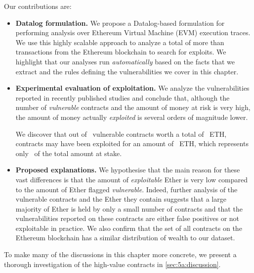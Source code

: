  Our contributions are:\itemsep=0pt
\begin{itemize}\itemsep=-2pt
\item \textbf{Datalog formulation.}
    We propose a Datalog-based formulation for performing analysis over Ethereum Virtual Machine (EVM) execution traces. We use this highly scalable approach to analyze a total of more than~ transactions from the Ethereum blockchain to search for exploits. We highlight that our analyses run \emph{automatically} based on the facts that we extract and the rules defining the vulnerabilities we cover in this chapter.

\item \textbf{Experimental evaluation of exploitation.}
    We analyze the vulnerabilities reported in \PapersAnalyzed recently published studies and conclude that, although the number of \emph{vulnerable} contracts and the amount of money at risk is very high, the amount of money actually \emph{exploited} is several orders of magnitude lower.

    We discover that out of~\empirical{\VulnerableContracts} vulnerable contracts worth a total of~\empirical{\EtherStake} ETH,~\empirical{\NumExploitedContracts} contracts may have been exploited for an amount of~\empirical{\ExploitedEther} ETH, which represents only~\empirical{\PercentExploitedEther} of the total amount at stake.

\item \textbf{Proposed explanations.}
    We hypothesise that the main reason for these vast differences is that the amount of \emph{exploitable} Ether is very low compared to the amount of Ether flagged \emph{vulnerable}.
    Indeed, further analysis of the vulnerable contracts and the Ether they contain suggests that a large majority of Ether is held by only a small number of contracts and that the vulnerabilities reported on these contracts are either false positives or not exploitable in practice. We also confirm that the set of all contracts on the Ethereum blockchain has a similar distribution of wealth to our dataset.
\end{itemize}
To make many of the discussions in this chapter more concrete, we present a thorough investigation of the high-value contracts in \autoref{sec:5a:discussion}. 

